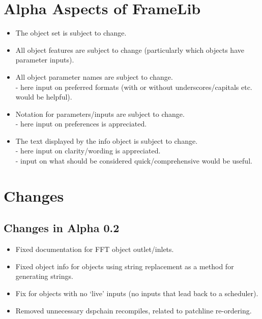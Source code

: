 \documentclass{article}
\begin{document}
\pagebreak

\section{Alpha Aspects of FrameLib}
\vspace{0.1in}

 \begin{itemize}
\item{The object set is subject to change.}
\item{All object features are subject to change (particularly which objects have parameter inputs).}
\item{All object parameter names are subject to change. \\
 - here input on preferred formats (with or without underscores/capitals etc. would be helpful).}
\item{Notation for parameters/inputs are subject to change. \\
 - here input on preferences is appreciated.}
\item{The text displayed by the info object is subject to change. \\
 - here input on clarity/wording is appreciated. \\
 - input on what should be considered quick/comprehensive would be useful.}
  \end{itemize}
  
\pagebreak

\section{Changes}

\subsection{Changes in Alpha 0.2}
\vspace{0.1in}

\begin{itemize}
\item Fixed documentation for FFT object outlet/inlets.
\item Fixed object info for objects using string replacement as a method for generating strings.
\item Fix for objects with no `live' inputs (no inputs that lead back to a scheduler).
\item Removed unnecessary dspchain recompiles, related to patchline re-ordering.
\end{itemize}
\end{document}

